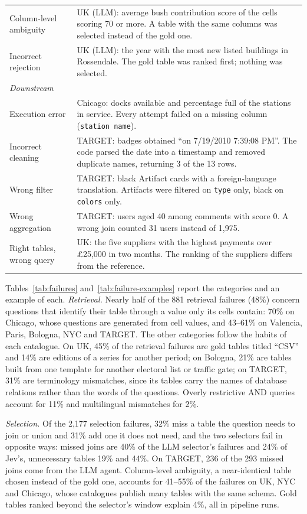 \begin{table}[t]
\begin{tabular}{lp{8.0cm}}
Column-level ambiguity & UK (LLM): average bush contribution score of the cells scoring 70 or more. A table with the same columns was selected instead of the gold one. \\
Incorrect rejection & UK (LLM): the year with the most new listed buildings in Rossendale. The gold table was ranked first; nothing was selected. \\
\multicolumn{2}{l}{\emph{Downstream}} \\
Execution error & Chicago: docks available and percentage full of the stations in service. Every attempt failed on a missing column (\texttt{station name}). \\
Incorrect cleaning & TARGET: badges obtained ``on 7/19/2010 7:39:08 PM''. The code parsed the date into a timestamp and removed duplicate names, returning 3 of the 13 rows. \\
Wrong filter & TARGET: black Artifact cards with a foreign-language translation. Artifacts were filtered on \texttt{type} only, black on \texttt{colors} only. \\
Wrong aggregation & TARGET: users aged 40 among comments with score 0. A wrong join counted 31 users instead of 1{,}975. \\
Right tables, wrong query & UK: the five suppliers with the highest payments over \pounds 25,000 in two months. The ranking of the suppliers differs from the reference. \\
\hline
\end{tabular}
\end{table}

Tables~\ref{tab:failures} and~\ref{tab:failure-examples} report the categories
and an example of each. \emph{Retrieval.} Nearly half of the 881 retrieval
failures (48\%) concern questions that identify their table through a value
only its cells contain: 70\% on Chicago, whose questions are generated from
cell values, and 43--61\% on Valencia, Paris, Bologna, NYC and TARGET. The
other categories follow the habits of each catalogue. On UK, 45\% of the
retrieval failures are gold tables titled ``CSV'' and 14\% are editions of a
series for another period; on Bologna, 21\% are tables built from one template
for another electoral list or traffic gate; on TARGET, 31\% are terminology
mismatches, since its tables carry the names of database relations rather
than the words of the questions. Overly restrictive AND queries account for
11\% and multilingual mismatches for 2\%.

\emph{Selection.} Of the 2{,}177 selection failures, 32\% miss a table the
question needs to join or union and 31\% add one it does not need, and the two
selectors fail in opposite ways: missed joins are 40\% of the LLM selector's
failures and 24\% of Jev's, unnecessary tables 19\% and 44\%. On TARGET, 236
of the 293 missed joins come from the LLM agent. Column-level ambiguity, a
near-identical table chosen instead of the gold one, accounts for 41--55\% of
the failures on UK, NYC and Chicago, whose catalogues publish many tables with
the same schema. Gold tables ranked beyond the selector's window explain 4\%,
all in pipeline runs.

